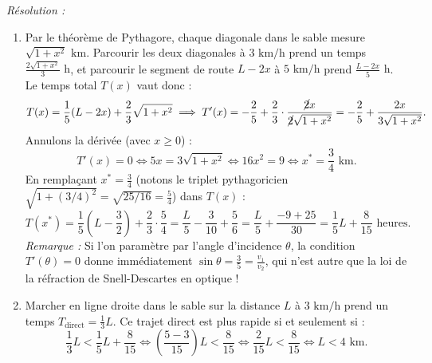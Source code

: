 \begin{exemple}
\begin{center}
\end{center}
\emph{Résolution :}
\begin{enumerate}[label=\alph*)]
    \item Par le théorème de Pythagore, chaque diagonale dans le sable mesure $\sqrt{1 + x^2}\text{ km}$. Parcourir les deux diagonales à $3\text{ km/h}$ prend un temps $\frac{2\sqrt{1+x^2}}{3}\text{ h}$, et parcourir le segment de route $L - 2x$ à $5\text{ km/h}$ prend $\frac{L-2x}{5}\text{ h}$. Le temps total $T(x)$ vaut donc :
    \[
        T(x) = \frac{1}{5}(L - 2x) + \frac{2}{3}\sqrt{1 + x^2} \implies T'(x) = -\frac{2}{5} + \frac{2}{3}\cdot\frac{\cancel{2}x}{\cancel{2}\sqrt{1+x^2}} = -\frac{2}{5} + \frac{2x}{3\sqrt{1+x^2}}.
    \]
    Annulons la dérivée (avec $x \ge 0$) :
    \[
        T'(x) = 0 \iff 5x = 3\sqrt{1+x^2} \iff 16x^2 = 9 \iff \boxed{x^* = \frac{3}{4}\text{ km}}.
    \]
    En remplaçant $x^* = \frac{3}{4}$ (notons le triplet pythagoricien $\sqrt{1 + (3/4)^2} = \sqrt{25/16} = \frac{5}{4}$) dans $T(x)$ :
    \[
        T(x^*) = \frac{1}{5}\left(L - \frac{3}{2}\right) + \frac{2}{3} \cdot \frac{5}{4} = \frac{L}{5} - \frac{3}{10} + \frac{5}{6} = \frac{L}{5} + \frac{-9 + 25}{30} = \boxed{\frac{1}{5}L + \frac{8}{15}\text{ heures}}.
    \]
    \emph{Remarque :} Si l'on paramètre par l'angle d'incidence $\theta$, la condition $T'(\theta) = 0$ donne immédiatement $\sin\theta = \frac{3}{5} = \frac{v_1}{v_2}$, qui n'est autre que la loi de la réfraction de Snell-Descartes en optique !
    \item Marcher en ligne droite dans le sable sur la distance $L$ à $3\text{ km/h}$ prend un temps $T_{\text{direct}} = \frac{1}{3}L$. Ce trajet direct est plus rapide si et seulement si :
    \[
        \frac{1}{3}L < \frac{1}{5}L + \frac{8}{15} \iff \left(\frac{5 - 3}{15}\right)L < \frac{8}{15} \iff \frac{2}{15}L < \frac{8}{15} \iff \boxed{L < 4\text{ km}}.
    \]
\end{enumerate}


\end{exemple}
